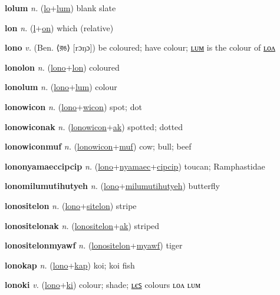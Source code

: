 \textbf{\hypertarget{lolum}{lolum}} \textit{n.} (\hyperlink{lo}{lo}+\allowbreak \hyperlink{lum}{lum})
blank slate

\textbf{\hypertarget{lon}{lon}} \textit{n.} (\hyperlink{l}{l}+\allowbreak \hyperlink{on}{on})
which (relative)

\textbf{\hypertarget{lono}{lono}} \textit{v.} (Ben. ⟨{\bengali{}রঙ}⟩ [rɔŋɔ])
be coloured; have colour; \hyperlink{lonolum}{ʟᴜᴍ} is the colour of \hyperlink{lonolon}{ʟᴏᴧ}

\textbf{\hypertarget{lonolon}{lonolon}} \textit{n.} (\hyperlink{lono}{lono}+\allowbreak \hyperlink{lon}{lon})
coloured

\textbf{\hypertarget{lonolum}{lonolum}} \textit{n.} (\hyperlink{lono}{lono}+\allowbreak \hyperlink{lum}{lum})
colour

\textbf{\hypertarget{lonowicon}{lonowicon}} \textit{n.} (\hyperlink{lono}{lono}+\allowbreak \hyperlink{wicon}{wicon})
spot; dot

\textbf{\hypertarget{lonowiconak}{lonowiconak}} \textit{n.} (\hyperlink{lonowicon}{lonowicon}+\allowbreak \hyperlink{ak}{ak})
spotted; dotted

\textbf{\hypertarget{lonowiconmuf}{lonowiconmuf}} \textit{n.} (\hyperlink{lonowicon}{lonowicon}+\allowbreak \hyperlink{muf}{muf})
cow; bull; beef

\textbf{\hypertarget{lononyamaeccipcip}{lononyamaeccipcip}} \textit{n.} (\hyperlink{lono}{lono}+\allowbreak \hyperlink{nyamaec}{nyamaec}+\allowbreak \hyperlink{cipcip}{cipcip})
toucan; Ramphastidae

\textbf{\hypertarget{lonomilumutihutyeh}{lonomilumutihutyeh}} \textit{n.} (\hyperlink{lono}{lono}+\allowbreak \hyperlink{milumutihutyeh}{milumutihutyeh})
butterfly

\textbf{\hypertarget{lonositelon}{lonositelon}} \textit{n.} (\hyperlink{lono}{lono}+\allowbreak \hyperlink{sitelon}{sitelon})
stripe

\textbf{\hypertarget{lonositelonak}{lonositelonak}} \textit{n.} (\hyperlink{lonositelon}{lonositelon}+\allowbreak \hyperlink{ak}{ak})
striped

\textbf{\hypertarget{lonositelonmyawf}{lonositelonmyawf}} \textit{n.} (\hyperlink{lonositelon}{lonositelon}+\allowbreak \hyperlink{myawf}{myawf})
tiger

\textbf{\hypertarget{lonokap}{lonokap}} \textit{n.} (\hyperlink{lono}{lono}+\allowbreak \hyperlink{kap}{kap})
koi; koi fish

\textbf{\hypertarget{lonoki}{lonoki}} \textit{v.} (\hyperlink{lono}{lono}+\allowbreak \hyperlink{ki}{ki})
colour; shade; \hyperlink{lonokiles}{ʟєꜱ} colours ʟᴏᴧ ʟᴜᴍ

